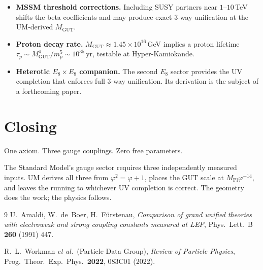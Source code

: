 \documentclass[12pt]{article}
\begin{document}
\begin{itemize}
  \item \textbf{MSSM threshold corrections.}
        Including SUSY partners near $1$--$10$\,TeV shifts the beta
        coefficients and may produce exact 3-way unification at the
        UM-derived $M_{\text{GUT}}$.
  \item \textbf{Proton decay rate.}
        $M_{\text{GUT}} \approx 1.45\times10^{16}$\,GeV implies a proton
        lifetime $\tau_p \sim M_{\text{GUT}}^4 / m_p^5 \sim 10^{35}$\,yr,
        testable at Hyper-Kamiokande.
  \item \textbf{Heterotic $E_8 \times E_8$ companion.}
        The second $E_8$ sector provides the UV completion that enforces
        full 3-way unification. Its derivation is the subject of a
        forthcoming paper.
\end{itemize}

\section*{Closing}

One axiom. Three gauge couplings. Zero free parameters.

The Standard Model's gauge sector requires three independently measured
inputs. UM derives all three from $\varphi^2 = \varphi + 1$, places the GUT scale at
$M_{\text{Pl}}\varphi^{-14}$, and leaves the running to whichever UV
completion is correct. The geometry does the work; the physics follows.

\begin{thebibliography}{9}
U.~Amaldi, W.~de~Boer, H.~F{\"u}rstenau,
\textit{Comparison of grand unified theories with electroweak and strong coupling constants measured at LEP},
Phys.\ Lett.\ B \textbf{260} (1991) 447.

R.~L.~Workman \textit{et al.}\ (Particle Data Group),
\textit{Review of Particle Physics},
Prog.\ Theor.\ Exp.\ Phys.\ \textbf{2022}, 083C01 (2022).
\end{thebibliography}
\end{document}
